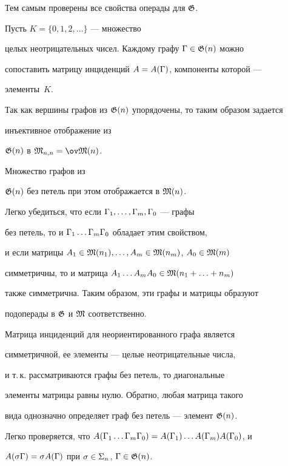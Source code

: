 \begin{pf}
Тем самым проверены все свойства операды для ${\frak G}$. 





Пусть $K=\{0, 1, 2,\dotsc \}$ --- множество 


целых неотрицательных чисел. Каждому графу ${\Gamma}\in{\frak G} (n)$ можно


сопоставить матрицу инциденций $A=A({\Gamma} )$, компоненты которой ---


элементы~$K$.


Так как вершины графов из ${\frak G} (n)$ упорядочены, то таким образом задается


инъективное отображение из


${\frak G} (n)$ в $\M_{n,n}=\ov\M (n)$.


Множество графов из


${\frak G} (n)$ без петель при этом отображается в ${\frak M} (n)$.





Легко убедиться, что если ${\Gamma}_1, \dotsc , {\Gamma}_m, {\Gamma}_0$ --- графы 


без петель, то и ${\Gamma}_1\dotsc {\Gamma}_m{\Gamma}_0$ обладает этим свойством, 


и если матрицы $A_1\in{\frak M} (n_1),\dotsc , A_m\in{\frak M} (n_m)$, $A_0\in{\frak M} (m)$


симметричны, то и матрица $A_1\dotsc A_mA_0\in{\frak M} (n_1+\dotsc +n_m)$ 


также симметрична. Таким образом, эти графы и матрицы образуют 


подоперады в ${\frak G}$ и ${\frak M}$ соответственно.





Матрица инциденций для неориентированного графа является 


симметричной, ее элементы --- целые неотрицательные числа, 


и т.\,к. рассматриваются графы без петель, то диагональные 


элементы матрицы равны нулю. Обратно, любая матрица такого 


вида однозначно определяет граф без петель --- элемент ${\frak G} (n)$. 


Легко проверяется, что $A({\Gamma}_1\dotsc {\Gamma}_m{\Gamma}_0)=A({\Gamma}_1)\dotsc A({\Gamma}_m)A({\Gamma}_0)$, и


$A(\sigma {\Gamma})=\sigma A({\Gamma})$ при $\sigma\in \Sigma_n$, ${\Gamma}\in {\frak G} (n)$.


\end{pf}








